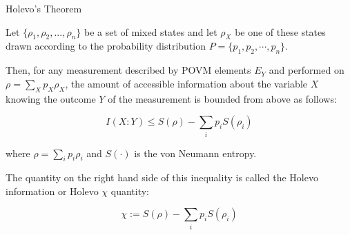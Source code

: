 \documentclass[main.tex]{subfiles}
\begin{document}
\begin{theorem}\label{thm:holevo}
Holevo's Theorem

Let $\{\rho_1, \rho_2, ..., \rho_n\}$ be a set of mixed states and let $\rho_X$ be one of these states drawn according to the probability distribution $P = \{p_1, p_2, \cdots , p_n\}$.

Then, for any measurement described by POVM elements ${E_Y}$ and performed on $ \rho =\sum _{X}p_{X}\rho _{X}$, the amount of accessible information about the variable $X$ knowing the outcome $Y$ of the measurement is bounded from above as follows:

$${ I(X:Y)\leq S(\rho )-\sum _{i}p_{i}S(\rho _{i})}$$ 

where $\rho =\sum _{i}p_{i}\rho _{i}$ and $ S(\cdot )$ is the von Neumann entropy.

The quantity on the right hand side of this inequality is called the Holevo information or Holevo $\chi$ quantity:

$$ \chi :=S(\rho )-\sum _{i}p_{i}S(\rho _{i})$$
\end{theorem}
\end{document}
